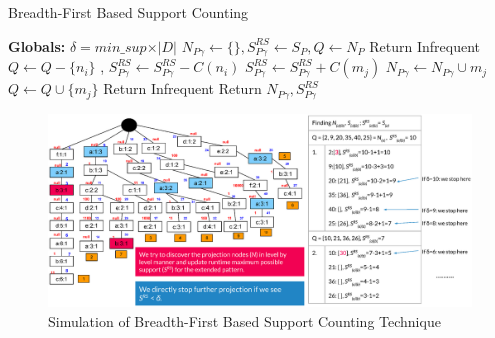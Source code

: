 \begin{algorithm}[!t]
           \scriptsize %
            \caption{Breadth-First Based Support Counting}
            \label{algorithm:breadth_first_support}
        \begin{algorithmic}[1]
            \State \textbf{Globals: }$\delta = min\_sup \times \vert D \vert$
                \State {}
                \State $N_{P\gamma} \gets \{\},S^{RS}_{P\gamma} \gets S_{P},Q \gets N_{P}$
                 \State {}
                    \State Return Infrequent
                    \EndIf
                    \State {}
                    \State $Q \gets Q - \{n_{i}\}$ , $S^{RS}_{P\gamma} \gets S^{RS}_{P\gamma}-C(n_{i})$
                        \State {}
                        \State $S^{RS}_{P\gamma} \gets S^{RS}_{P\gamma}+C(m_{j})$
                            \State $N_{P\gamma} \gets  N_{P\gamma} \cup m_{j}$
                        \Else  {}
                            \State $Q \gets Q \cup \{m_{j}\}$
                        \EndIf
                    \EndFor
                     Return Infrequent
                    \EndIf
                \EndFor
                \State Return $N_{P\gamma},S^{RS}_{P\gamma}$ 
            \EndProcedure
        \end{algorithmic}
    \end{algorithm}

\begin{figure}[!t]
\centering
\includegraphics[width=\textwidth]{Example-Breadth-First-Support}
\caption{Simulation of Breadth-First Based Support Counting Technique} \label{figure:breadth_first_technique_example}
\hfil
\end{figure}

